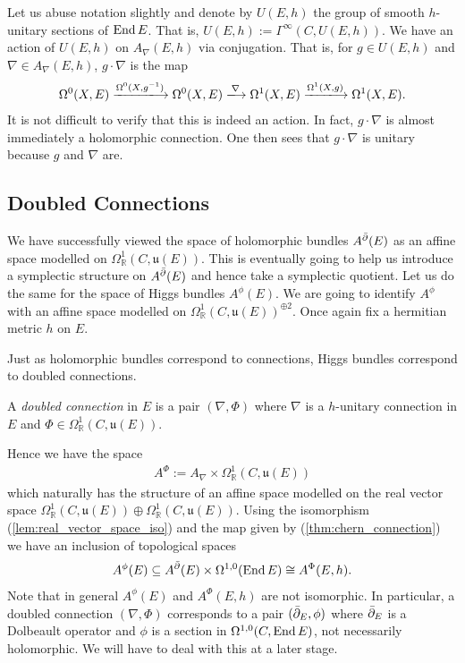 \documentclass[12pt]{ociamthesis}  %
\begin{document}
Let us abuse notation slightly and denote by $U(E,h)$ the group of smooth
$h$-unitary sections of $\operatorname{End} E$. That is, $U(E,h) := \Gamma^\infty(C,U(E,h))$.
We have an action of $U(E,h)$ on $A_\nabla(E,h)$ via conjugation. That is,
for $g\in U(E,h)$ and $\nabla\in A_\nabla(E,h)$, $g\cdot\nabla$ is the map
\begin{align*}
  \Omega^0(X,E) \xlongrightarrow{\Omega^0(X,{g}^{-1})}
  \Omega^0(X,E) \xlongrightarrow{\nabla}
  \Omega^1(X,E) \xlongrightarrow{\Omega^1(X,g)}
  \Omega^1(X,E).
\end{align*}
It is not difficult to verify that this is indeed an action.
In fact, $g\cdot\nabla$ is almost immediately a holomorphic connection.
One then sees that $g\cdot\nabla$ is unitary because
$g$ and $\nabla$ are.


\subsection{Doubled Connections}

We have successfully viewed the space of holomorphic bundles $A^{\bar{\partial}} (E)$
as an affine space modelled on
$\Omega^1_{\mathbb{R}}(C,\mathfrak{u}(E))$. This is eventually going
to help us introduce a symplectic structure on $A^{\bar{\partial}} (E)$ and hence
take a symplectic quotient. Let us do the same for the space of Higgs
bundles $A^\phi(E)$. We are going to identify $A^{\phi}$ with an affine
space modelled on $\Omega^1_{\mathbb{R}}(C,\mathfrak u(E))^{\oplus 2}$.
Once again fix a hermitian metric $h$ on $E$.

Just as holomorphic bundles correspond to connections, Higgs bundles
correspond to doubled connections.

\begin{definition}
  A \emph{doubled connection} in $E$ is a pair $(\nabla,\Phi)$
  where $\nabla$ is a $h$-unitary connection in $E$ and
  $\Phi\in\Omega^1_{\mathbb{R}}(C,\mathfrak u(E))$.
\end{definition}

Hence we have the space
\begin{align}\label{eq:doubled_connections_space}
  A^{\Phi} := A_\nabla \times \Omega^1_{\mathbb{R}}(C,\mathfrak u(E))
\end{align}
which naturally has the structure of an affine space modelled on
the real vector space
$\Omega^1_{\mathbb{R}}(C,\mathfrak u(E))\oplus\Omega_{\mathbb{R}}^1(C,\mathfrak u(E))$. Using the isomorphism (\ref{lem:real_vector_space_iso})
and the map given by (\ref{thm:chern_connection}) we have an inclusion
of topological spaces
\begin{align*}
  A^\phi(E) \subseteq A^{\bar{\partial}} (E) \times \Omega^{1,0}(\operatorname{End} E) \cong A^\Phi (E,h).
\end{align*}
Note that in general $A^\phi(E)$ and $A^\Phi (E,h)$ are not isomorphic. In
particular, a doubled connection $(\nabla,\Phi)$ corresponds to
a pair $(\bar{\partial}_E,\phi)$ where $\bar{\partial}_E$ is a Dolbeault operator and
$\phi$ is a section in $\Omega^{1,0}(C,\operatorname{End} E)$, not necessarily
holomorphic. We will have to deal with this at a later stage.
\end{document}

